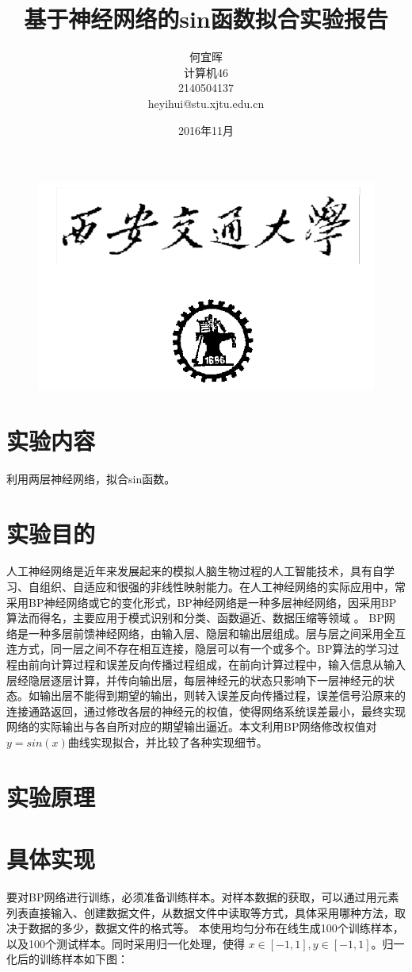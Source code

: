 \documentclass{article}
\date{2016年11月}
\title{基于神经网络的sin函数拟合实验报告}
\author{何宜晖\\计算机46\\2140504137\\heyihui@stu.xjtu.edu.cn}
\begin{document}
\begin{CJK}{UTF8}{gkai}
\begin{figure}
\centering
\includegraphics[width=0.6\linewidth]{xjtu}
\end{figure}


\maketitle
\clearpage
\section{实验内容}
利用两层神经网络，拟合sin函数。
\section{实验目的}
人工神经网络是近年来发展起来的模拟人脑生物过程的人工智能技术，具有自学习、自组织、自适应和很强的非线性映射能力。在人工神经网络的实际应用中，常采用BP神经网络或它的变化形式，BP神经网络是一种多层神经网络，因采用BP算法而得名，主要应用于模式识别和分类、函数逼近、数据压缩等领域 \cite{bao2010} 。  
BP网络是一种多层前馈神经网络，由输入层、隐层和输出层组成。层与层之间采用全互连方式，同一层之间不存在相互连接，隐层可以有一个或多个。BP算法的学习过程由前向计算过程和误差反向传播过程组成，在前向计算过程中，输入信息从输入层经隐层逐层计算，并传向输出层，每层神经元的状态只影响下一层神经元的状态。如输出层不能得到期望的输出，则转入误差反向传播过程，误差信号沿原来的连接通路返回，通过修改各层的神经元的权值，使得网络系统误差最小，最终实现网络的实际输出与各自所对应的期望输出逼近。本文利用BP网络修改权值对$y=sin(x)$曲线实现拟合，并比较了各种实现细节。

\section{实验原理}

\section{具体实现}
要对BP网络进行训练，必须准备训练样本。对样本数据的获取，可以通过用元素列表直接输入、创建数据文件，从数据文件中读取等方式，具体采用哪种方法，取决于数据的多少，数据文件的格式等。  本使用均匀分布在线生成100个训练样本，以及100个测试样本。同时采用归一化处理，使得 $x \in [-1, 1], y\in [-1, 1]$。归一化后的训练样本如下图：


\end{CJK}
\end{document}
